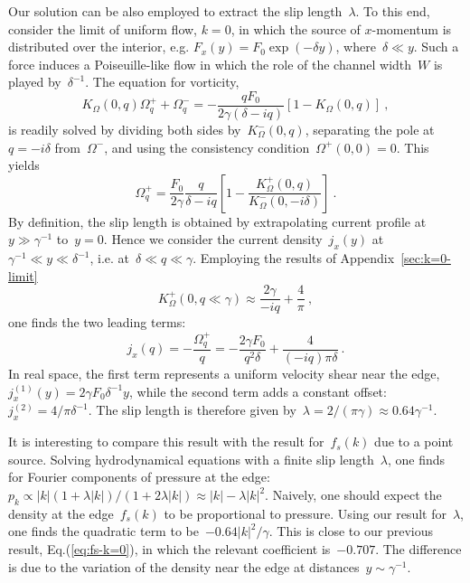 \documentclass[preprint,aps,eqsecnum, prb]{revtex4-1}
\newcommand{\fplus}[1]{{#1}^{+}}
\newcommand{\fminus}[1]{{#1}^{-}}
\begin{document}
Our solution can be also employed to extract the slip length~$\lambda$.
To this end, consider the limit of uniform flow, $k = 0$,
in which the source of $x$-momentum is distributed over
the interior, e.g. $F_x(y) = F_0 \exp(-\delta y)$, where~$\delta \ll y$.
Such a force induces a Poiseuille-like flow in which the role of
the channel width~$W$ is played by~$\delta^{-1}$. The equation for
vorticity,
\begin{equation}
  K_\Omega(0, q) \fplus{\Omega}_q + \fminus{\Omega}_q =
  - \frac{q F_0}{2\gamma (\delta - i q)} \left[1 - K_\Omega(0, q)\right]
  \ ,
\end{equation}
is readily solved by dividing both sides by~$\fminus{K}_\Omega(0, q)$,
separating the pole at~$q = -i \delta$ from~$\fminus{\Omega}$,
and using the consistency condition~$\fplus{\Omega}(0, 0) = 0$. This yields
\begin{equation}
  \fplus{\Omega}_q = \frac{F_0}{2\gamma} \frac{q}{\delta - i q}
  \left[1 - \frac{\fplus{K}_\Omega(0, q)}{\fminus{K}_\Omega(0, -i \delta)}
  \right]
  \ .
\end{equation}
By definition,
the slip length is obtained by extrapolating current profile
at~$y \gg \gamma^{-1}$ to~$y = 0$.
Hence we consider the current density~$j_x(y)$
at~$\gamma^{-1} \ll y \ll \delta^{-1}$, i.e. at~$\delta \ll q  \ll \gamma$.
Employing the results of Appendix~\ref{sec:k=0-limit}
\begin{equation}
  \fplus{K}_\Omega(0, q\ll \gamma) \approx \frac{2\gamma}{-iq} + \frac{4}{\pi}
  \ ,
\end{equation}
one finds the two leading terms:
\begin{equation}
  j_x(q) = - \frac{\fplus{\Omega}_q}{q} = - \frac{2 \gamma F_0}{q^2\delta}
  + \frac{4}{(-iq)  \pi \delta}
  \ .
\end{equation}
In real space, the first term represents a uniform velocity shear near the
edge, $j_x^{(1)}(y) = 2 \gamma F_0 \delta^{-1} y$, while the second term
adds a constant offset: $j_x^{(2)} = 4 / \pi \delta^{-1}$. The slip
length is therefore given
by~$\lambda = 2/(\pi \gamma) \approx 0.64 \gamma^{-1}$.

It is interesting to compare this result with the result for~$f_s(k)$
due to a point source. Solving hydrodynamical equations with a finite
slip length~$\lambda$, one finds for Fourier components of
pressure at the edge:
$p_k \propto |k| (1 + \lambda |k|)/(1 + 2 \lambda|k|)
\approx |k| - \lambda |k|^2$. Naively, one should expect the
density at the edge~$f_s(k)$ to be proportional to pressure.
Using our result for~$\lambda$, one
finds the quadratic term to be~$-0.64 |k|^2/\gamma$. This is close
to our previous result, Eq.(\ref{eq:fs-k=0}), in which the relevant
coefficient is~$-0.707$. The difference is due to the variation
of the density near the edge at distances~$y\sim\gamma^{-1}$.
\end{document}
